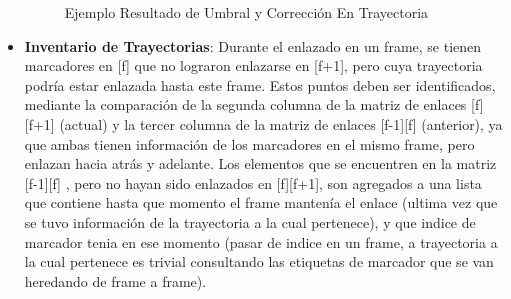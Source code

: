 \begin{itemize}
\begin{figure}[H]
 \centering
 \caption{Ejemplo Resultado de Umbral y Corrección En Trayectoria}
\label{distro_acc_track_m13_fix}
\end{figure}
\item \textbf{Inventario de Trayectorias}: Durante el enlazado en un frame, se tienen marcadores en [f] que no lograron enlazarse en [f+1], pero cuya trayectoria podría estar enlazada hasta este frame.
Estos puntos deben ser identificados, mediante la comparación de la segunda columna de la matriz de enlaces [f][f+1] (actual) y la tercer columna de la matriz de enlaces [f-1][f] (anterior), ya que ambas tienen información de los marcadores en el mismo frame, pero enlazan hacia atrás y adelante.
Los elementos que se encuentren en la matriz [f-1][f] , pero no hayan sido enlazados en [f][f+1], son agregados a una lista que  contiene hasta que momento el frame mantenía el enlace (ultima vez que se tuvo información de la trayectoria a la cual pertenece), y que indice de marcador tenia en ese momento (pasar de indice en un frame, a trayectoria a la cual pertenece es trivial consultando las etiquetas de marcador que se van heredando de frame a frame).


\end{itemize}

